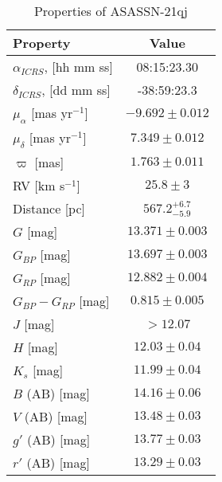 \documentclass[sn-nature,oneside]{sn-jnl}%
\newcommand{\asas}{ASASSN-21qj}
\begin{document}
\begin{table}
    \centering
    \caption{Properties of \asas}
    \begin{tabular}{@{}lc@{}}
    \hline\hline
Property                               & Value                    \\
        \hline
         $\alpha_{ICRS}$, {[}hh mm ss{]}  & 08:15:23.30\footnotemark[1]  \\
         $\delta_{ICRS}$, {[}dd mm ss{]}  & -38:59:23.3\footnotemark[1]  \\
         $\mu_{\alpha}$ {[}mas yr$^{-1}${]}     & $-9.692\pm0.012$\footnotemark[1]   \\
         $\mu_{\delta}$ {[}mas yr$^{-1}${]}     & $7.349\pm0.012$\footnotemark[1]  \\
         $\varpi$ {[}mas{]}                     & $1.763\pm0.011$\footnotemark[1]   \\
         RV {[}km s$^{-1}${]}                   & $25.8\pm3$\footnotemark[1] \\
         Distance {[}pc{]}                      & $567.2^{+6.7}_{-5.9}$\footnotemark[2] \\ 
        \hline
         $G$ {[}mag{]}                          & $13.371\pm 0.003$\footnotemark[1]  \\
         $G_{BP}$ {[}mag{]}                     & $13.697\pm 0.003$\footnotemark[1]    \\
         $G_{RP}$ {[}mag{]}                     & $12.882\pm 0.004$\footnotemark[1]   \\
         $G_{BP}-G_{RP}$ {[}mag{]}              & $0.815\pm 0.005$\footnotemark[1]         \\
         $J$ {[}mag{]}                          & $>12.07$\footnotemark[3]   \\
         $H$ {[}mag{]}                          & $12.03\pm0.04$\footnotemark[3]    \\
         $K_s$ {[}mag{]}                          & $11.99\pm0.04$\footnotemark[3]    \\
         $B$ (AB) {[}mag{]}                     & $14.16\pm0.06$\footnotemark[4]     \\
         $V$ (AB) {[}mag{]}                     & $13.48\pm0.03$\footnotemark[4]   \\
         $g'$ (AB) {[}mag{]}                     & $13.77\pm0.03$\footnotemark[4]  \\
         $r'$ (AB) {[}mag{]}                     & $13.29\pm0.03$\footnotemark[4]     \\

\end{tabular}
\end{table}
\end{document}

